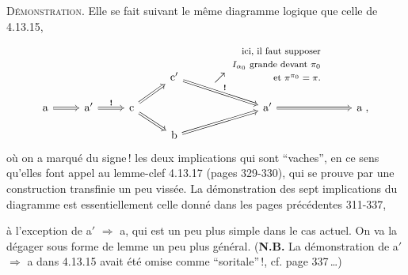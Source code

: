 \documentclass[11pt]{article}
\newcommand{\printedpage}[1]{\marginpar{\footnotesize p.~#1}}
\newcommand{\msp}[1]{\marginpar{\footnotesize [#1]}}
\begin{document}
\textsc{Démonstration}. Elle se fait suivant le même diagramme logique que celle de 4.13.15,
\[
\begin{tikzcd}[row sep=small]
& & & \mathrm{c}' \arrow[dr, Rightarrow, "\textbf{!}"] & \nearrow\ \begin{tabular}[b]{@{}r@{}}\footnotesize ici, il faut supposer\\ \footnotesize $I_{\alpha_0}$ grande devant $\pi_0$\\ \footnotesize et $\pi^{\pi_0} = \pi$.\end{tabular} & \\
\mathrm{a} \arrow[r, Rightarrow] & \mathrm{a}' \arrow[r, Rightarrow, "\textbf{!}"] & \mathrm{c} \arrow[ur, Rightarrow] \arrow[dr, Rightarrow] & & \mathrm{a}' \arrow[r, Rightarrow] & \mathrm{a} \; , \\
& & & \mathrm{b} \arrow[ur, Rightarrow] & &
\end{tikzcd}
\]
où on a marqué du signe\,! les deux implications qui sont ``vaches'', en ce sens qu'elles font appel au lemme-clef 4.13.17 (pages 329-330), qui se prouve par une construction transfinie un peu vissée. La démonstration des sept implications du diagramme est essentiellement
celle donné dans les pages précédentes 311-337, %

\setcounter{footnote}{143}

\printedpage{129}

\msp{page 340}
à l'exception de a$'$ $\Longrightarrow$ a, qui est un peu plus simple dans le cas actuel. On va la dégager sous forme de lemme un peu plus général. (\textbf{N.B.} La démonstration de a$'$ $\Longrightarrow$ a dans 4.13.15 avait été omise comme “soritale”\,!, cf. page 337\,\dots)
\end{document}
